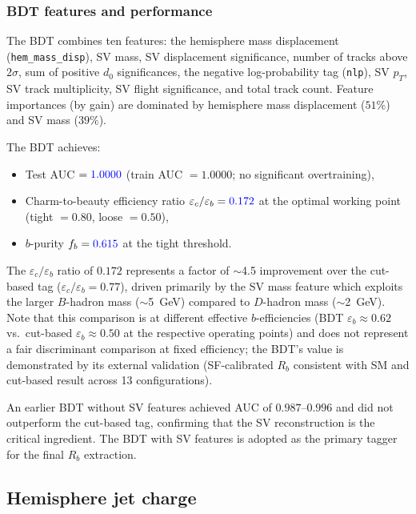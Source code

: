 \documentclass[11pt,a4paper]{article}
\newcommand{\measured}[1]{\textcolor{blue}{#1}}
\begin{document}
\subsubsection{BDT features and performance}

The BDT combines ten features: the hemisphere mass displacement
(\texttt{hem\_mass\_disp}), SV mass, SV displacement significance,
number of tracks above $2\sigma$, sum of positive $d_0$
significances, the negative log-probability tag (\texttt{nlp}),
SV $p_T$, SV track multiplicity, SV flight significance, and
total track count.
Feature importances (by gain) are dominated by
hemisphere mass displacement ($51\%$) and SV mass ($39\%$).

The BDT achieves:
\begin{itemize}
\item Test AUC $= \measured{1.0000}$ (train AUC $= 1.0000$; no
  significant overtraining),
\item Charm-to-beauty efficiency ratio
  $\varepsilon_c/\varepsilon_b = \measured{0.172}$ at the
  optimal working point (tight $= 0.80$, loose $= 0.50$),
\item $b$-purity $f_b = \measured{0.615}$ at the tight threshold.
\end{itemize}
The $\varepsilon_c/\varepsilon_b$ ratio of $0.172$ represents a
factor of $\sim$4.5 improvement over the cut-based tag
($\varepsilon_c/\varepsilon_b = 0.77$), driven primarily by the
SV mass feature which exploits the larger $B$-hadron mass
($\sim$5~GeV) compared to $D$-hadron mass ($\sim$2~GeV).
Note that this comparison is at different effective $b$-efficiencies
(BDT $\varepsilon_b \approx 0.62$ vs.\ cut-based
$\varepsilon_b \approx 0.50$ at the respective operating points)
and does not represent a fair discriminant comparison at fixed
efficiency; the BDT's value is demonstrated by its external
validation (SF-calibrated $R_b$ consistent with SM and cut-based
result across 13 configurations).

An earlier BDT without SV features achieved AUC of
$0.987$--$0.996$ and did not outperform the cut-based tag,
confirming that the SV reconstruction is the critical ingredient.
The BDT with SV features is adopted as the primary tagger for the
final $R_b$ extraction.

\subsection{Hemisphere jet charge}
\label{sec:tagging:jetcharge}
\end{document}
